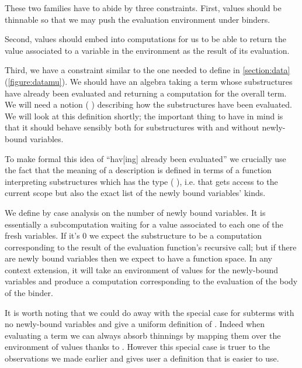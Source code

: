 {
\label{defn:Semantics}
}

These two families have to abide by three constraints. First, values
should be thinnable so that we may push the evaluation environment
under binders.


Second, values should embed into computations for us to be able to
return the value associated to a variable in the environment as the
result of its evaluation.


Third, we have a constraint similar to the one needed to define  in
\cref{section:data} (\cref{figure:datamu}). We should have an algebra taking
a term whose substructures have already been evaluated and returning a
computation for the overall term.
%
We will need a notion {(  )} describing how
the substructures have been evaluated. We will look at this definition
shortly; the important thing to have in mind is that it should behave
sensibly both for substructures with and without newly-bound variables.


To make formal this idea of ``hav[ing] already been evaluated'' we
crucially use the fact that the meaning of a description is defined
in terms of a function interpreting substructures which has the type
(   ), i.e. that gets access
to the current scope but also the exact list of the newly bound
variables' kinds.

We define  by case analysis on the number of newly bound
variables. It is essentially a subcomputation waiting for a value
associated to each one of the fresh variables. If it's $0$ we expect
the substructure to be a computation corresponding to the result of
the evaluation function's recursive call; but if there are newly bound
variables then we expect to have a function space. In any context
extension, it will take an environment of values for the newly-bound
variables and produce a computation corresponding to the evaluation
of the body of the binder.

{
\label{defn:Kripke}
}

It is worth noting that we could do away with the special case for
subterms with no newly-bound variables and give a uniform definition
of . Indeed when evaluating a term we can always absorb
thinnings by mapping them over the environment of values thanks to
.
%
However this special case is truer to the observations we made earlier
and gives user a definition that is easier to use.


